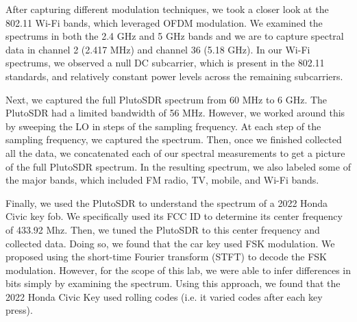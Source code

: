\documentclass{article}
\begin{document}
After capturing different modulation techniques, we took a closer look at the 802.11 Wi-Fi bands, which leveraged OFDM modulation. We examined the spectrums in both the 2.4 GHz and 5 GHz bands and we are to capture spectral data in channel 2 (2.417 MHz) and channel 36 (5.18 GHz). In our Wi-Fi spectrums, we observed a null DC subcarrier, which is present in the 802.11 standards, and relatively constant power levels across the remaining subcarriers.

Next, we captured the full PlutoSDR spectrum from 60 MHz to 6 GHz. The PlutoSDR had a limited bandwidth of 56 MHz. However, we worked around this by sweeping the LO in steps of the sampling frequency. At each step of the sampling frequency, we captured the spectrum. Then, once we finished collected all the data, we concatenated each of our spectral measurements to get a picture of the full PlutoSDR spectrum. In the resulting spectrum, we also labeled some of the major bands, which included FM radio, TV, mobile, and Wi-Fi bands.

Finally, we used the PlutoSDR to understand the spectrum of a 2022 Honda Civic key fob. We specifically used its FCC ID to determine its center frequency of 433.92 Mhz. Then, we tuned the PlutoSDR to this center frequency and collected data. Doing so, we found that the car key used FSK modulation. We proposed using the short-time Fourier transform (STFT) to decode the FSK modulation. However, for the scope of this lab, we were able to infer differences in bits simply by examining the spectrum. Using this approach, we found that the 2022 Honda Civic Key used rolling codes (i.e. it varied codes after each key press).




%
%
	
\end{document}
